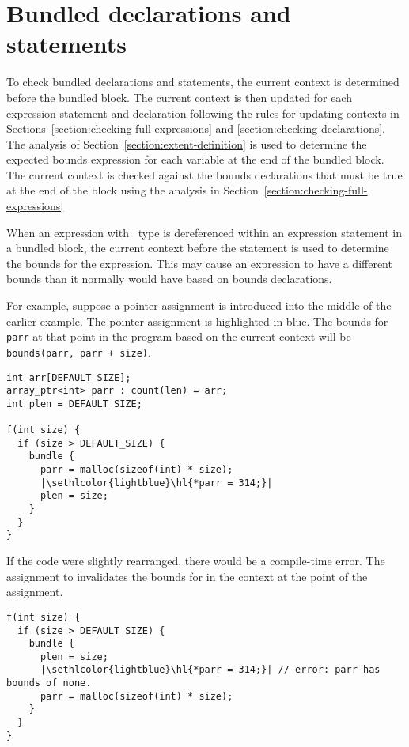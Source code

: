 \section{Bundled declarations and statements}
\label{section:checking-bundled}

To check bundled declarations and statements, the current context is
determined before the bundled block. The current context is then updated
for each expression statement and declaration following the rules for
updating contexts in Sections~\ref{section:checking-full-expressions} and
\ref{section:checking-declarations}. The analysis of 
Section~\ref{section:extent-definition}
is used to determine the expected bounds expression for each variable at
the end of the bundled block. The current context is checked against the
bounds declarations that must be true at the end of the block using the
analysis in Section~\ref{section:checking-full-expressions}

When an expression with \arrayptr\ type is dereferenced within
an expression statement in a bundled block, the current context before
the statement is used to determine the bounds for the expression. This
may cause an expression to have a different bounds than it normally
would have based on bounds declarations.

For example, suppose a pointer assignment is introduced into the middle
of the earlier example. The pointer assignment is highlighted in blue.
The bounds for \lstinline|parr| at that point in the program based on the
current context will be \lstinline|bounds(parr, parr + size)|.

\begin{lstlisting}[escapechar=\|]
int arr[DEFAULT_SIZE];
array_ptr<int> parr : count(len) = arr;
int plen = DEFAULT_SIZE;

f(int size) {
  if (size > DEFAULT_SIZE) {
    bundle {
      parr = malloc(sizeof(int) * size);
      |\sethlcolor{lightblue}\hl{*parr = 314;}|
      plen = size;
    }
  }
}
\end{lstlisting}

If the code were slightly rearranged, there would be a compile-time
error. The assignment to  invalidates the bounds for
 in the context at the point of the assignment.

\begin{lstlisting}[escapechar=\|]
f(int size) {
  if (size > DEFAULT_SIZE) {
    bundle {
      plen = size;
      |\sethlcolor{lightblue}\hl{*parr = 314;}| // error: parr has bounds of none.
      parr = malloc(sizeof(int) * size);
    }
  }
}
\end{lstlisting}

